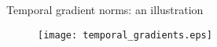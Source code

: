 \begin{frame}{Temporal gradient norms: an illustration}
\begin{figure}
	\centering
	\texttt{[image: temporal\_gradients.eps]}
\end{figure}
\end{frame}

